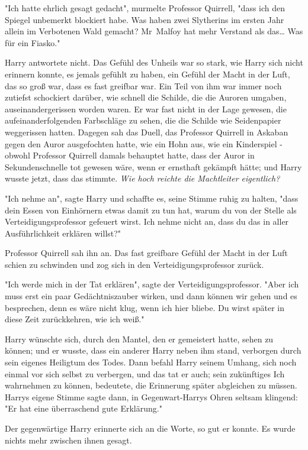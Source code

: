 {"Ich hatte ehrlich gesagt gedacht", murmelte Professor Quirrell, "dass ich den Spiegel unbemerkt blockiert habe. Was haben zwei Slytherins im ersten Jahr allein im Verbotenen Wald gemacht? Mr~Malfoy hat mehr Verstand als das… Was für ein Fiasko."

Harry antwortete nicht. Das Gefühl des Unheils war so stark, wie Harry sich nicht erinnern konnte, es jemals gefühlt zu haben, ein Gefühl der Macht in der Luft, das so groß war, dass es fast greifbar war. Ein Teil von ihm war immer noch zutiefst schockiert darüber, wie schnell die Schilde, die die Auroren umgaben, auseinandergerissen worden waren. Er war fast nicht in der Lage gewesen, die aufeinanderfolgenden Farbschläge zu sehen, die die Schilde wie Seidenpapier weggerissen hatten. Dagegen sah das Duell, das Professor Quirrell in Askaban gegen den Auror ausgefochten hatte, wie ein Hohn aus, wie ein Kinderspiel - obwohl Professor Quirrell damals behauptet hatte, dass der Auror in Sekundenschnelle tot gewesen wäre, wenn er ernsthaft gekämpft hätte; und Harry wusste jetzt, dass das stimmte. \emph{Wie hoch reichte die Machtleiter eigentlich?}

"Ich nehme an", sagte Harry und schaffte es, seine Stimme ruhig zu halten, "dass dein Essen von Einhörnern etwas damit zu tun hat, warum du von der Stelle als Verteidigungsprofessor gefeuert wirst. Ich nehme nicht an, dass du das in aller Ausführlichkeit erklären willst?"

Professor Quirrell sah ihn an. Das fast greifbare Gefühl der Macht in der Luft schien zu schwinden und zog sich in den Verteidigungsprofessor zurück.

"Ich werde mich in der Tat erklären", sagte der Verteidigungsprofessor. "Aber ich muss erst ein paar Gedächtniszauber wirken, und dann können wir gehen und es besprechen, denn es wäre nicht klug, wenn ich hier bliebe. Du wirst später in diese Zeit zurückkehren, wie ich weiß."

Harry wünschte sich, durch den Mantel, den er gemeistert hatte, sehen zu können; und er wusste, dass ein anderer Harry neben ihm stand, verborgen durch sein eigenes Heiligtum des Todes. Dann befahl Harry seinem Umhang, sich noch einmal vor sich selbst zu verbergen, und das tat er auch; sein zukünftiges Ich wahrnehmen zu können, bedeutete, die Erinnerung später abgleichen zu müssen. Harrys eigene Stimme sagte dann, in Gegenwart-Harrys Ohren seltsam klingend: "Er hat eine überraschend gute Erklärung."

Der gegenwärtige Harry erinnerte sich an die Worte, so gut er konnte. Es wurde nichts mehr zwischen ihnen gesagt.

}
